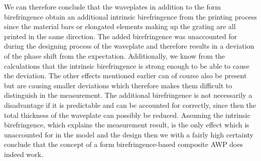 We can therefore conclude that the waveplates in addition to the form birefringence obtain an additional intrinsic birefringence from the printing process since the material bars or elongated elements making up the grating are all printed in the same direction. The added birefringence was unaccounted for during the designing process of the waveplate and therefore results in a deviation of the phase shift from the expectation. Additionally, we know from the calculations that the intrinsic birefringence is strong enough to be able to cause the deviation. The other effects mentioned earlier can of course also be present but are causing smaller deviations which therefore makes them difficult to distinguish in the measurement. The additional birefringence is not necessarily a disadvantage if it is predictable and can be accounted for correctly, since then the total thickness of the waveplate can possibly be reduced. Assuming the intrinsic birefringence, which explains the measurement result, is the only effect which is unaccounted for in the model and the design then we with a fairly high certainty conclude that the concept of a form birefringence-based composite AWP does indeed work. 

